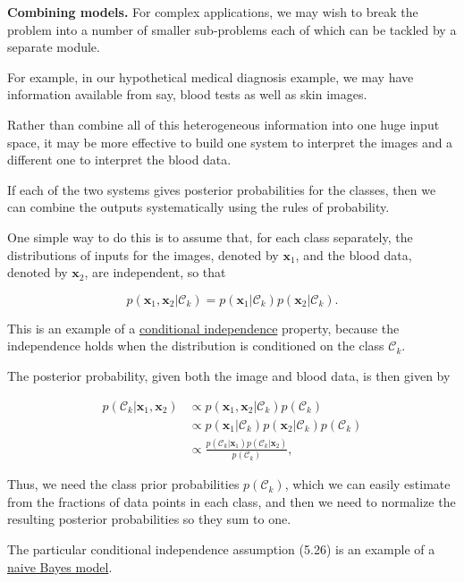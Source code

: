 \documentclass{article}
\begin{document}
\textbf{Combining models.} For complex applications, we may wish to break the problem into a number of smaller sub-problems each of which can be tackled by a separate module. 

For example, in our hypothetical medical diagnosis example, we may have information available from say, blood tests as well as skin images. 

Rather than combine all of this heterogeneous information into one huge input space, it may be more effective to build one system to interpret the images and a different one to interpret the blood data. 

If each of the two systems gives posterior probabilities for the classes, then we can combine the outputs systematically using the rules of probability. 

One simple way to do this is to assume that, for each class separately, the distributions of inputs for the images, denoted by $\mathbf{x}_{1}$, and the blood data, denoted by $\mathbf{x}_{2}$, are independent, so that

\begin{equation}
p(\mathbf{x}_{1},\mathbf{x}_{2}|\mathcal{C}_{k}) = p(\mathbf{x}_{1}|\mathcal{C}_{k})p(\mathbf{x}_{2}|\mathcal{C}_{k}).
\tag{5.26}
\end{equation}

This is an example of a \underline{\color{red}conditional independence} property, because the independence holds when the distribution is conditioned on the class $\mathcal{C}_{k}$. 

The posterior probability, given both the image and blood data, is then given by

\begin{align}
p(\mathcal{C}_{k}|\mathbf{x}_{1},\mathbf{x}_{2}) &\propto p(\mathbf{x}_{1},\mathbf{x}_{2}|\mathcal{C}_{k})p(\mathcal{C}_{k}) \\
&\propto p(\mathbf{x}_{1}|\mathcal{C}_{k})p(\mathbf{x}_{2}|\mathcal{C}_{k})p(\mathcal{C}_{k}) \\
&\propto \frac{p(\mathcal{C}_{k}|\mathbf{x}_{1})p(\mathcal{C}_{k}|\mathbf{x}_{2})}{p(\mathcal{C}_{k})},
\tag{5.27}
\end{align}

Thus, we need the class prior probabilities $p(\mathcal{C}_{k})$, which we can easily estimate from the fractions of data points in each class, and then we need to normalize the resulting posterior probabilities so they sum to one. 

The particular conditional independence assumption (5.26) is an example of a \underline{\color{red}naive Bayes model}. 
\end{document}
